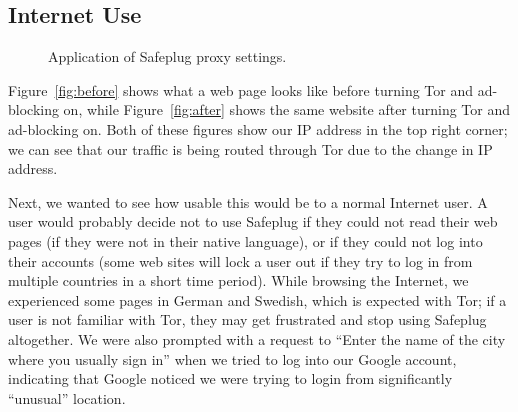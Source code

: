 \documentclass[conference]{IEEEtran}
\begin{document}
\subsection{Internet Use}
\label{inetuse}

\begin{figure}[tb]
\centering
{}
\quad
{}
\caption{Application of Safeplug proxy settings.}
\end{figure}

Figure~\ref{fig:before} shows what a web page looks like before turning Tor and ad-blocking on, while Figure~\ref{fig:after} shows the same website after turning Tor and ad-blocking on.  Both of these figures show our IP address in the top right corner; we can see that our traffic is being routed through Tor due to the change in IP address.  

Next, we wanted to see how usable this would be to a normal Internet user.  A user would probably decide not to use Safeplug if they could not read their web pages (if they were not in their native language), or if they could not log into their accounts (some web sites will lock a user out if they try to log in from multiple countries in a short time period).  While browsing the Internet, we experienced some pages in German and Swedish, which is expected with Tor; if a user is not familiar with Tor, they may get frustrated and stop using Safeplug altogether.  We were also prompted with a request to ``Enter the name of the city where you usually sign in'' when we tried to log into our Google account, indicating that Google noticed we were trying to login from significantly ``unusual'' location.
\end{document}
